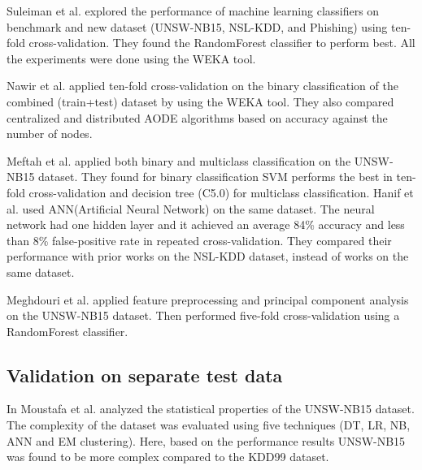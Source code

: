 \documentclass[14pt, conference]{IEEEtran}
\begin{document}
 Suleiman et al. \cite{suleiman2018performance} explored the performance of machine learning classifiers on benchmark
and new dataset (UNSW-NB15, NSL-KDD, and Phishing) using ten-fold cross-validation. They found the RandomForest
classifier to perform best. All the experiments were done using the WEKA tool.

Nawir et al. \cite{nawir2019effective} applied ten-fold cross-validation on the binary classification of the combined
(train+test) dataset by using the WEKA tool. They also compared centralized and distributed AODE algorithms based on
accuracy against the number of nodes.

 Meftah et al. \cite{meftah2019network} applied both binary and multiclass
classification on the UNSW-NB15 dataset. They found for binary classification SVM performs the best in ten-fold
cross-validation and decision tree (C5.0) for multiclass classification.
Hanif et al. \cite{hanif2019intrusion} used ANN(Artificial Neural Network)
on the same dataset. The neural network had one hidden layer and it achieved an average 84\% accuracy and less
than 8\% false-positive rate in repeated cross-validation. They compared their performance with prior works on the
NSL-KDD dataset, instead of works on the same dataset.

 Meghdouri et al. \cite{meghdouri2018analysis} applied feature preprocessing and principal component analysis on the
 UNSW-NB15 dataset. Then performed five-fold cross-validation using a RandomForest classifier.

\subsection{Validation on separate test data}
In \cite{moustafa2016evaluation} Moustafa et al. analyzed the statistical properties of the UNSW-NB15 dataset. The complexity of the dataset was evaluated using
five techniques (DT, LR, NB, ANN and EM clustering). Here, based on the performance results UNSW-NB15 was found to be
more complex compared to the KDD99 dataset.
\end{document}
